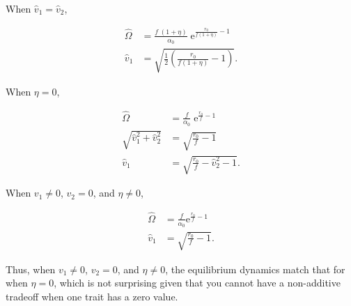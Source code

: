 When $\hat{v}_1 = \hat{v}_2$,

\begin{equation}  \label{eq:two-traits-finals1}
\begin{split}
    \hat{\Omega} &= \frac{ f \; ( 1 + \eta ) }{ \alpha_0 } \;
        \textrm{e}^{\frac{  r_0 }{ f ( 1 + \eta ) } - 1 }
        \\
    \hat{v}_1 &= \sqrt{
        \frac{1}{2} \left( \frac{ r_0 }{ f (1 + \eta) } - 1 \right)
    }
    \textrm{.}
\end{split}
\end{equation}


\noindent When $\eta = 0$,

\begin{equation}  \label{eq:two-traits-finals2}
\begin{split}
    \hat{\Omega} &= \frac{ f }{ \alpha_0 } \; \textrm{e}^{\frac{ r_0 }{ f } - 1 } \\
    \sqrt{\hat{v}_1^2 + \hat{v}_2^2} &= \sqrt{ \frac{ r_0 }{ f } - 1 } \\
    \hat{v}_1 &= \sqrt{ \frac{ r_0  }{ f } - \hat{v}_2^2 - 1 }
    \textrm{.}
\end{split}
\end{equation}


\noindent When $v_1 \ne 0$, $v_2 = 0$, and $\eta \ne 0$,

\begin{equation}  \label{eq:two-traits-finals3}
\begin{split}
    \hat{\Omega} &= \frac{f}{\alpha_0} \textrm{e}^{\frac{r_0}{f} - 1} \\
    \hat{v}_1 &= \sqrt{ \frac{ r_0 }{ f } - 1 }
    \textrm{.}
\end{split}
\end{equation}

\noindent Thus, when $v_1 \ne 0$, $v_2 = 0$, and $\eta \ne 0$, the equilibrium
dynamics match that for when $\eta = 0$, which is not surprising given that
you cannot have a non-additive tradeoff when one trait has a zero value.



